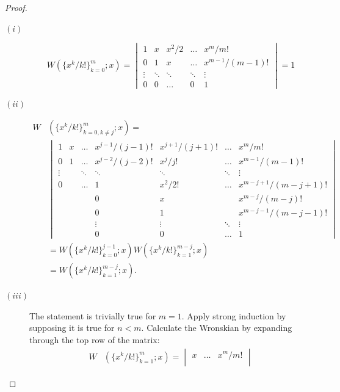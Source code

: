\documentclass{book}
\begin{document}
\begin{proof}
\begin{description}
\item[$(i)$] \begin{equation*}
W(\{ x^k/k! \}_{k=0}^m ; x) = \begin{vmatrix} 1 & x & x^2/2 & \dots & x^m/m! \\
0 & 1 & x & \dots & x^{m-1}/(m-1)! \\
\vdots & \ddots & \ddots & \ddots & \vdots \\
0 & 0 & \dots & 0 & 1 \end{vmatrix} = 1
\end{equation*}
\item[$(ii)$] \begin{align*}
W & (\{ x^k/k! \}_{k=0, k \neq j}^m ; x) = && \\
& \begin{vmatrix}
1      & x      & \dots  & x^{j-1}/(j-1)! & x^{j+1}/(j+1)! & \dots & x^m    /m!     \\
0      & 1      & \dots  & x^{j-2}/(j-2)! & x^j    / j!    & \dots & x^{m-1}/(m-1)! \\
\vdots &        & \ddots & \ddots         & \ddots         & \ddots& \vdots         \\
0      &        & \dots  & 1              & x^2/2!         & \dots & x^{m-j+1}/(m-j+1)!\\
       &        &        & 0              & x              &       & x^{m-j}/(m-j)! \\
       &        &        & 0              & 1              &       & x^{m-j-1}/(m-j-1)!\\
       &        &        & \vdots         & \vdots         & \ddots& \vdots         \\
       &        &        & 0              & 0              & \dots & 1
\end{vmatrix} \\
& = W(\{ x^k/k! \}_{k=0}^{j-1} ; x) W(\{ x^k/k! \}_{k=1}^{m-j} ; x) \\
& = W(\{ x^k/k! \}_{k=1}^{m-j} ; x) .
\end{align*}
\item[$(iii)$] The statement is trivially true for $m=1$.
Apply strong induction by supposing it is true for $n<m$.
Calculate the Wronskian by expanding through the top row of the matrix:
\begin{align*}
W & (\{ x^k/k! \}_{k=1}^m ; x) = \begin{vmatrix}
x & \dots & x^m/m! \\

\end{vmatrix}
\end{align*}
\end{description}
\end{proof}
\end{document}
